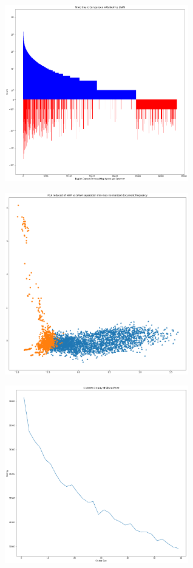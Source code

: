 \documentclass[a4paper,11pt]{article}
\begin{document}
\begin{figure}
\centering
\includegraphics[width=8cm]{WordFrequency_ham_vs_spam}
\caption{}
\label{fig-1}
\end{figure}
\begin{figure}
\centering
\includegraphics[width=8cm]{pca_reduction_data}
\caption{}
\label{fig-2}
\end{figure}
\begin{figure}
\centering
\includegraphics[width=8cm]{kmans_elbow}
\caption{}
\label{fig-3}
\end{figure}
\end{document}
